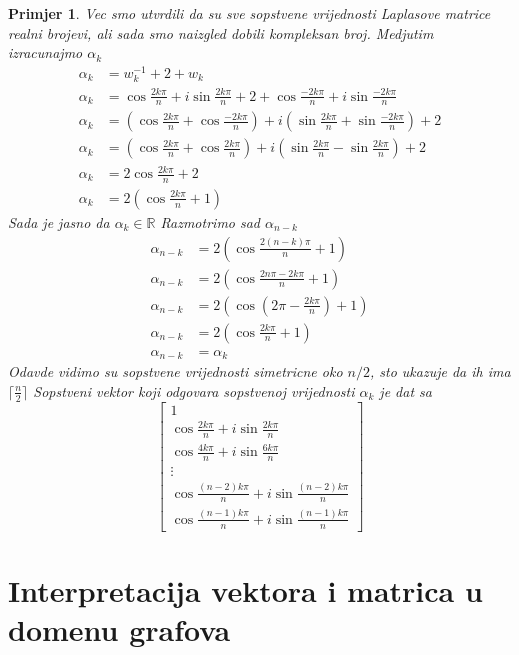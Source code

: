 \documentclass[11pt]{article}
\newtheorem{example}{Primjer}
\begin{document}
\begin{example}
	Vec smo utvrdili da su sve sopstvene vrijednosti Laplasove matrice realni brojevi, ali sada smo naizgled dobili kompleksan broj. Medjutim izracunajmo $\alpha_k$
	\[
	\begin{split}
		\alpha_k & = w_k^{-1} + 2 + w_k \\
		\alpha_k & = \cos \frac{2 k \pi}{n} + i \sin \frac{2 k \pi}{n} + 2 + \cos \frac{-2 k \pi}{n} + i \sin \frac{-2 k \pi}{n} \\
		\alpha_k & = (\cos \frac{2 k \pi}{n} + \cos \frac{-2 k \pi}{n}) + i(\sin \frac{2 k \pi}{n} + \sin \frac{-2 k \pi}{n}) + 2 \\
		\alpha_k & = (\cos \frac{2 k \pi}{n} + \cos \frac{2 k \pi}{n}) + i(\sin \frac{2 k \pi}{n} - \sin \frac{2 k \pi}{n}) + 2 \\
		\alpha_k & = 2\cos \frac{2 k \pi}{n} + 2 \\
		\alpha_k & = 2 (\cos \frac{2 k \pi}{n} + 1)
	\end{split}
	\]
	Sada je jasno da $\alpha_k \in \mathbb{R}$
	Razmotrimo sad $\alpha_{n-k}$
	\[
	\begin{split}
		\alpha_{n-k} & = 2 (\cos \frac{2 (n-k) \pi}{n} + 1) \\
		\alpha_{n-k} & = 2 (\cos \frac{2n\pi - 2k\pi}{n} + 1) \\
		\alpha_{n-k} & = 2 (\cos ( 2\pi - \frac{2k\pi}{n}) + 1) \\
		\alpha_{n-k} & = 2 (\cos \frac{2k\pi}{n} + 1) \\ 
		\alpha_{n-k} & = \alpha_k 
	\end{split}
	\]
	Odavde vidimo su sopstvene vrijednosti simetricne oko $n/2$, sto ukazuje da ih ima $\lceil \frac{n}{2}\rceil$ 
	Sopstveni vektor koji odgovara sopstvenoj vrijednosti $\alpha_k$ je dat sa 
	\[
	\begin{bmatrix}
	1 \\
	\cos \frac{2 k \pi}{n} + i \sin \frac{2 k \pi}{n} \\
	\cos \frac{4 k \pi}{n} + i \sin \frac{6 k \pi}{n} \\
	\vdots \\
	\cos \frac{(n-2) k \pi}{n} + i \sin \frac{(n-2) k \pi}{n} \\
	\cos \frac{(n-1) k \pi}{n} + i \sin \frac{(n-1) k \pi}{n} 
	\end{bmatrix}
	\]

	\end{example}

	\section{Interpretacija vektora i matrica u domenu grafova}
\end{document}
